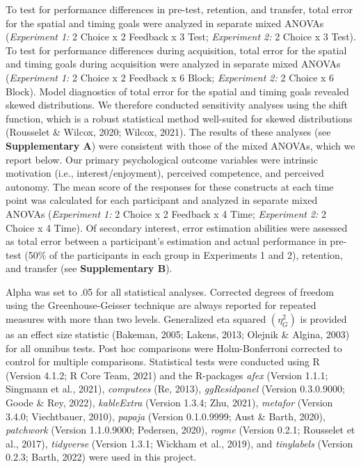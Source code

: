 \documentclass[
  man, donotrepeattitle,floatsintext]{apa7}
\begin{document}
To test for performance differences in pre-test, retention, and transfer, total error for the spatial and timing goals were analyzed in separate mixed ANOVAs (\emph{Experiment 1:} 2 Choice x 2 Feedback x 3 Test; \emph{Experiment 2:} 2 Choice x 3 Test). To test for performance differences during acquisition, total error for the spatial and timing goals during acquisition were analyzed in separate mixed ANOVAs (\emph{Experiment 1:} 2 Choice x 2 Feedback x 6 Block; \emph{Experiment 2:} 2 Choice x 6 Block). Model diagnostics of total error for the spatial and timing goals revealed skewed distributions. We therefore conducted sensitivity analyses using the shift function, which is a robust statistical method well-suited for skewed distributions (Rousselet \& Wilcox, 2020; Wilcox, 2021). The results of these analyses (see \textbf{Supplementary A}) were consistent with those of the mixed ANOVAs, which we report below. Our primary psychological outcome variables were intrinsic motivation (i.e., interest/enjoyment), perceived competence, and perceived autonomy. The mean score of the responses for these constructs at each time point was calculated for each participant and analyzed in separate mixed ANOVAs (\emph{Experiment 1:} 2 Choice x 2 Feedback x 4 Time; \emph{Experiment 2:} 2 Choice x 4 Time). Of secondary interest, error estimation abilities were assessed as total error between a participant's estimation and actual performance in pre-test (50\% of the participants in each group in Experiments 1 and 2), retention, and transfer (see \textbf{Supplementary B}).

Alpha was set to .05 for all statistical analyses. Corrected degrees of freedom using the Greenhouse-Geisser technique are always reported for repeated measures with more than two levels. Generalized eta squared \((\eta_{G}^2)\) is provided as an effect size statistic (Bakeman, 2005; Lakens, 2013; Olejnik \& Algina, 2003) for all omnibus tests. Post hoc comparisons were Holm-Bonferroni corrected to control for multiple comparisons. Statistical tests were conducted using R (Version 4.1.2; R Core Team, 2021) and the R-packages \emph{afex} (Version 1.1.1; Singmann et al., 2021), \emph{computees} (Re, 2013), \emph{ggResidpanel} (Version 0.3.0.9000; Goode \& Rey, 2022), \emph{kableExtra} (Version 1.3.4; Zhu, 2021), \emph{metafor} (Version 3.4.0; Viechtbauer, 2010), \emph{papaja} (Version 0.1.0.9999; Aust \& Barth, 2020), \emph{patchwork} (Version 1.1.0.9000; Pedersen, 2020), \emph{rogme} (Version 0.2.1; Rousselet et al., 2017), \emph{tidyverse} (Version 1.3.1; Wickham et al., 2019), and \emph{tinylabels} (Version 0.2.3; Barth, 2022) were used in this project.
\end{document}
